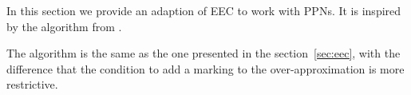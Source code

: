 In this section we provide an adaption of \ac{EEC} to work with \acp{PPN}.
It is inspired by the  algorithm from \cite{David17}.

The algorithm is the same as the one presented in the section~\ref{sec:eec}, with the difference that the condition to add a marking to the over-approximation is more restrictive.


